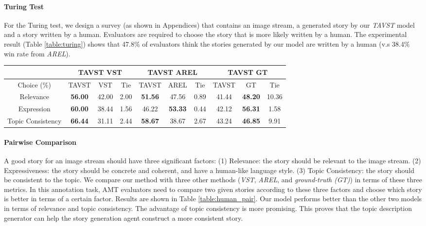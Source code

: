 \documentclass[11pt]{article}
\begin{document}
\paragraph{Turing Test}
For the Turing test, we design a survey (as shown in Appendices) that contains an image stream, a generated story by our \emph{TAVST} model and a story written by a human. Evaluators are required to choose the story that is more likely written by a human. The experimental result (Table \ref{table:turing}) shows that 47.8\% of evaluators think the stories generated by our model are written by a human (v.s 38.4\% win rate from \emph{AREL}). 

\begin{table*}[!htp]


	\centering
	\small
\begin{tabular}{c|ccc|ccc|ccc}
		\hline
		& \multicolumn{3}{c|}{TAVST   VST} & \multicolumn{3}{c|}{TAVST   AREL}& \multicolumn{3}{c}{TAVST   GT} \\
		\hline
		Choice (\%) & TAVST  & VST & Tie & TAVST  & AREL & Tie & TAVST  & GT & Tie \\
		\hline
		Relevance & \textbf{56.00} & 42.00 & 2.00 & \textbf{51.56} & 47.56 & 0.89 & 41.44 & \textbf{48.20} & 10.36 \\  
		Expression & \textbf{60.00} & 38.44 & 1.56 & 46.22 & \textbf{53.33} & 0.44 & 42.12 & \textbf{56.31} & 1.58 \\ 
		Topic Consistency & \textbf{66.44} & 31.11 & 2.44 & \textbf{58.67} & 38.67 & 2.67 & 43.24 & \textbf{46.85} & 9.91 \\ 
\hline
	\end{tabular}
	\vspace{-2mm}
\smallskip
	\caption{ Human evaluation results on pairwise comparison. }
	\label{table:human_pair}
	\vspace{-4mm}
\end{table*}




\paragraph{Pairwise Comparison}
A good story for an image stream should have three significant factors: (1) Relevance: the story should be relevant to the image stream. (2) Expressiveness: the story should be concrete and coherent, and have a human-like language style. (3) Topic Consistency: the story should be consistent to the topic. We compare our method with three other methods (\emph{VST}, \emph{AREL}, and \emph{ground-truth (GT)}) in terms of these three metrics.
In this annotation task, AMT evaluators need to compare two given stories according to these three factors and choose which story is better in terms of a certain factor. Results are shown in Table \ref{table:human_pair}. Our model performs better than the other two models in terms of relevance and topic consistency. The advantage of topic consistency is more promising. This proves that the topic description generator can help the story generation agent construct a more consistent story. 
\end{document}
